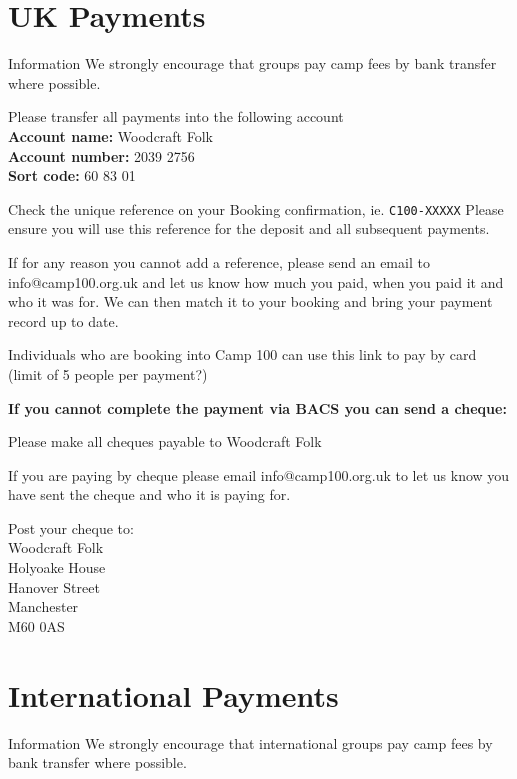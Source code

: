 \documentclass[a4paper, 11pt]{report}
\begin{document}
\makedocumenttitlepage

\tableofcontents

\chapter{UK Payments}

\begin{callout-green}{Information}
We strongly encourage that groups pay camp fees by bank transfer where possible.
\end{callout-green}

Please transfer all payments into the following account\\
\textbf{Account name:} Woodcraft Folk\\
\textbf{Account number:} 2039 2756\\
\textbf{Sort code:} 60 83 01

Check the unique reference on your Booking confirmation, ie. \verb|C100-XXXXX| Please ensure you will use this reference for the deposit and all subsequent payments.

If for any reason you cannot add a reference, please send an email to info@camp100.org.uk and let us know how much you paid, when you paid it and who it was for. We can then match it to your booking and bring your payment record up to date.

Individuals who are booking into Camp 100 can use this link to pay by card (limit of 5 people per payment?)

\textbf{If you cannot complete the payment via BACS you can send a cheque:}

Please make all cheques payable to Woodcraft Folk

If you are paying by cheque please email info@camp100.org.uk to let us know you have sent the cheque and who it is paying for. 

Post your cheque to:\\
Woodcraft Folk\\
Holyoake House\\
Hanover Street\\
Manchester \\
M60 0AS\\

\chapter{International Payments}

\begin{callout-green}{Information}
We strongly encourage that international groups pay camp fees by bank transfer where possible. 
\end{callout-green}
\end{document}

